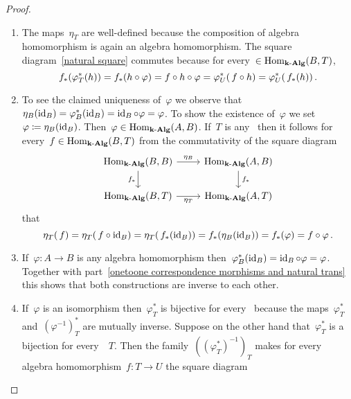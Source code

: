 \begin{proof}
  \leavevmode
  \begin{enumerate}
    \item
      The maps~$\eta_T$ are well-defined because the composition of algebra homomorphism is again an algebra homomorphism.
      The square diagram~\eqref{natural square} commutes because for every~$ \in \operatorname{Hom}_{\mathbf{k}\text{-}\mathbf{Alg}}(B,T)$,
      \[
        f_*( \varphi^*_T( h ) )
        =
        f_* (h \circ \varphi)
        =
        f \circ h \circ \varphi
        =
        \varphi^*_U(\, f \circ h)
        =
        \varphi^*_U(\, f_*(h))  \,.
      \]
    \item
      To see the claimed uniqueness of~$\varphi$ we observe that~$\eta_B(\operatorname{id}_B) = \varphi^*_B(\operatorname{id}_B) = \operatorname{id}_B \circ \varphi = \varphi$.
      To show the existence of~$\varphi$ we set~$\varphi \coloneqq \eta_B(\operatorname{id}_B)$.
      Then~$\varphi \in \operatorname{Hom}_{\mathbf{k}\text{-}\mathbf{Alg}}(A,B)$.
      If~$T$ is any~{\algebra{$\kf$}} then it follows for every~$f \in \operatorname{Hom}_{\mathbf{k}\text{-}\mathbf{Alg}}(B,T)$ from the commutativity of the square diagram
      \[
        \begin{tikzcd}
          \Hom_{\cAlg{\kf}}(B,B)
          \arrow{r}[above]{\eta_B}
          \arrow{d}[left]{f_*}
          &
          \Hom_{\cAlg{\kf}}(A,B)
          \arrow{d}[right]{\spacing f_*}
          \\
          \Hom_{\cAlg{\kf}}(B,T)
          \arrow{r}[below]{\eta_T}
          &
          \Hom_{\cAlg{\kf}}(A,T)
        \end{tikzcd}
      \]
      that
      \[
        \eta_T(\, f)
        =
        \eta_T(\, f \circ \operatorname{id}_B)
        =
        \eta_T(\, f_*(\operatorname{id}_B))
        =
        f_*(\eta_B(\operatorname{id}_B))
        =
        f_*(\varphi)
        =
        f \circ \varphi \,.
      \]
    \item
      If~$\varphi \colon A \to B$ is any algebra homomorphism then~$\varphi^*_B(\operatorname{id}_B) = \operatorname{id}_B \circ \varphi = \varphi$.
      Together with part~\ref*{onetoone correspondence morphisms and natural trans} this shows that both constructions are inverse to each other.
    \item
      If~$\varphi$ is an isomorphism then~$\varphi^*_T$ is bijective for every~{\algebra{$\kf$}} because the maps~$\varphi^*_T$ and~$(\varphi^{-1})^*_T$ are mutually inverse.
      Suppose on the other hand that~$\varphi^*_T$ is a bijection for every~{\algebra{$\kf$}}~$T$.
      Then the family~$( (\varphi^*_T)^{-1} )_T$ makes for every algebra homomorphism~$f \colon T \to U$ the square diagram

\end{enumerate}
\end{proof}
